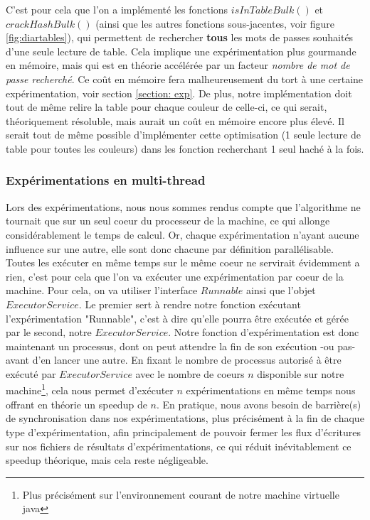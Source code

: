 \documentclass[french,12pt]{article}
\begin{document}
        
        C'est pour cela que l'on a implémenté les fonctions $isInTableBulk()$ et $crackHashBulk()$ (ainsi que les autres fonctions sous-jacentes, voir figure \ref{fig:diartables}), qui permettent de rechercher \textbf{tous} les mots de passes souhaités d'une seule lecture de table. Cela implique une expérimentation plus gourmande en mémoire, mais qui est en théorie accélérée par un facteur \textit{nombre de mot de passe recherché}. Ce coût en mémoire fera malheureusement du tort à une certaine expérimentation, voir section \ref{section: exp}.
        De plus, notre implémentation doit tout de même relire la table pour chaque couleur de celle-ci, ce qui serait, théoriquement résoluble, mais aurait un coût en mémoire encore plus élevé. Il serait tout de même possible d'implémenter cette optimisation (1 seule lecture de table pour toutes les couleurs) dans les fonction recherchant 1 seul haché à la fois. 
        
        
        
        \subsubsection{Expérimentations en multi-thread}
        Lors des expérimentations, nous nous sommes rendus compte que l'algorithme ne tournait que sur un seul coeur du processeur de la machine, ce qui allonge considérablement le temps de calcul. Or, chaque expérimentation n'ayant aucune influence sur une autre, elle sont donc chacune par définition parallélisable. Toutes les exécuter en même temps sur le même coeur ne servirait évidemment a rien, c'est pour cela que l'on va exécuter une expérimentation par coeur de la machine. Pour cela, on va utiliser l'interface $Runnable$\cite{Runnable} ainsi que l'objet $ExecutorService$\cite{ExeService}. Le premier sert à rendre notre fonction exécutant l'expérimentation "Runnable", c'est à dire qu'elle pourra être exécutée et gérée par le second, notre $ExecutorService$. Notre fonction d'expérimentation est donc maintenant un processus, dont on peut attendre la fin de son exécution -ou pas- avant d'en lancer une autre. En fixant le nombre de processus autorisé à être exécuté par $ExecutorService$ avec le nombre de coeurs $n$ disponible sur notre machine\footnote{Plus précisément sur l'environnement courant de notre machine virtuelle java\cite{VMJava}}, cela nous permet d'exécuter $n$ expérimentations en même temps nous offrant en théorie un speedup de $n$. En pratique, nous avons besoin de barrière(s) de synchronisation dans nos expérimentations, plus précisément à la fin de chaque type d'expérimentation, afin principalement de pouvoir fermer les flux d'écritures sur nos fichiers de résultats d'expérimentations, ce qui réduit inévitablement ce speedup théorique, mais cela reste négligeable.
\end{document}
